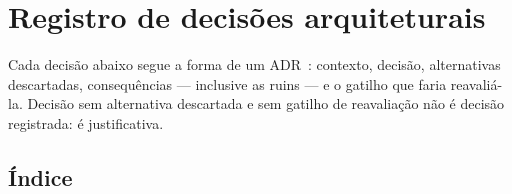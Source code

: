 \chapter{Registro de decisões arquiteturais}
\label{cap:adr}

Cada decisão abaixo segue a forma de um ADR~\cite{nygard2011adr}: contexto,
decisão, alternativas descartadas, consequências --- inclusive as ruins --- e o
gatilho que faria reavaliá-la. Decisão sem alternativa descartada e sem gatilho de
reavaliação não é decisão registrada: é justificativa.

\section{Índice}

